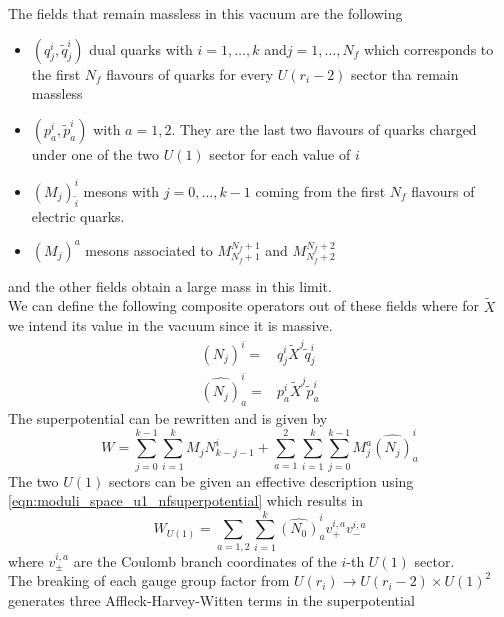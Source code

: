 The fields that remain massless in this vacuum are the following
\begin{itemize}
\item $\left(q_j^{i} , \tilde{q}_j^{i}\right)$ dual quarks with $i=1,\dotsc,k$ and$j=1,\dotsc,N_f$ which corresponds to the first $N_f$ flavours of quarks for every $U(r_i-2)$ sector tha remain massless
\item $\left(p_a^i , \tilde{p}_a^i\right)$ with $a=1,2$. They are the last two flavours of quarks charged under one of the two $U(1)$ sector for each value of $i$
\item $(M_j)^{i}_{\tilde{i}}$ mesons with $j=0,\dotsc,k-1$ coming from the first $N_f$ flavours of electric quarks.
\item $(M_j)^a$ mesons associated to $M^{N_f+1}_{N_f+1}$ and $M^{N_f+2}_{N_f+2}$
\end{itemize}
and the other fields obtain a large mass in this limit.\\
We can define the following composite operators out of these fields where for $\tilde{X}$ we intend its value in the vacuum since it is massive. 
\begin{align}
 (N_j)^i = & q_j^{i} \tilde{X}^j \tilde{q}_j^{i} \\
 \hat{(N_j)}_a^i =& p_a^i \tilde{X}^j \tilde{p}_a^i
\end{align}
The superpotential can be rewritten and is given by
\begin{equation}
W = \sum_{j=0}^{k-1} \sum_{i=1}^{k} M_j 
N_{k-j-1}^i
+
\sum_{a=1}^{2}  \sum_{i=1}^{k} \sum_{j=0}^{k-1} 
M_j^a 
\hat{(N_j)}_a^i
\end{equation}
The two $U(1)$ sectors can be given an effective description using \eqref{eqn:moduli_space_u1_nfsuperpotential} which results in
\begin{equation}
W_{U(1)} = \sum_{a=1,2} \sum_{i=1}^{k} \hat{(N_0)}_a^i {v}^{i,a}_+ {v}^{i,a}_-
\end{equation}
where ${v}^{i,a}_{\pm}$ are the Coulomb branch coordinates of the $i$-th  $U(1)$ sector.\\
The breaking of each gauge group factor from $U(r_i) \rightarrow U(r_i-2) \times U(1)^2$ generates three Affleck-Harvey-Witten terms in the superpotential
